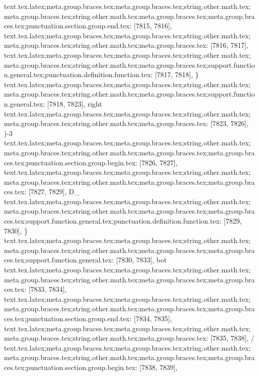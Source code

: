 {{{{{{{{{{{{{{{{{{{{{{{{{{{{{{{{{{{{{{{{{{{{{{{{{{{{{{{{{{{{{{{{{{{{{{{{{{{{{{{{{{{{{{{{{{{{{{{{{{{{{{{{{{{{{{{{{{{{{{{{{{{{{{{{{{{{{{{{{{{{{{{{{{{{{{{{{{{{{{{{{{{{{{{{{{{{{{{{{{{{{{{{{{{{{{{{{{{{{{{{{{{{{{{{{{{{{{{{{{{{{{{{{{{{{text.tex.latex;meta.group.braces.tex;meta.group.braces.tex;string.other.math.tex;meta.group.braces.tex;string.other.math.tex;meta.group.braces.tex;meta.group.braces.tex;punctuation.section.group.end.tex: [7815, 7816], {}}
text.tex.latex;meta.group.braces.tex;meta.group.braces.tex;string.other.math.tex;meta.group.braces.tex;string.other.math.tex;meta.group.braces.tex: [7816, 7817], { }
text.tex.latex;meta.group.braces.tex;meta.group.braces.tex;string.other.math.tex;meta.group.braces.tex;string.other.math.tex;meta.group.braces.tex;support.function.general.tex;punctuation.definition.function.tex: [7817, 7818], {\}
text.tex.latex;meta.group.braces.tex;meta.group.braces.tex;string.other.math.tex;meta.group.braces.tex;string.other.math.tex;meta.group.braces.tex;support.function.general.tex: [7818, 7823], {right}
text.tex.latex;meta.group.braces.tex;meta.group.braces.tex;string.other.math.tex;meta.group.braces.tex;string.other.math.tex;meta.group.braces.tex: [7823, 7826], {)-3}
text.tex.latex;meta.group.braces.tex;meta.group.braces.tex;string.other.math.tex;meta.group.braces.tex;string.other.math.tex;meta.group.braces.tex;meta.group.braces.tex;punctuation.section.group.begin.tex: [7826, 7827], {{}
text.tex.latex;meta.group.braces.tex;meta.group.braces.tex;string.other.math.tex;meta.group.braces.tex;string.other.math.tex;meta.group.braces.tex;meta.group.braces.tex: [7827, 7829], {D_}
text.tex.latex;meta.group.braces.tex;meta.group.braces.tex;string.other.math.tex;meta.group.braces.tex;string.other.math.tex;meta.group.braces.tex;meta.group.braces.tex;support.function.general.tex;punctuation.definition.function.tex: [7829, 7830], {\}
text.tex.latex;meta.group.braces.tex;meta.group.braces.tex;string.other.math.tex;meta.group.braces.tex;string.other.math.tex;meta.group.braces.tex;meta.group.braces.tex;support.function.general.tex: [7830, 7833], {bot}
text.tex.latex;meta.group.braces.tex;meta.group.braces.tex;string.other.math.tex;meta.group.braces.tex;string.other.math.tex;meta.group.braces.tex;meta.group.braces.tex: [7833, 7834], { }
text.tex.latex;meta.group.braces.tex;meta.group.braces.tex;string.other.math.tex;meta.group.braces.tex;string.other.math.tex;meta.group.braces.tex;meta.group.braces.tex;punctuation.section.group.end.tex: [7834, 7835], {}}
text.tex.latex;meta.group.braces.tex;meta.group.braces.tex;string.other.math.tex;meta.group.braces.tex;string.other.math.tex;meta.group.braces.tex: [7835, 7838], { / }
text.tex.latex;meta.group.braces.tex;meta.group.braces.tex;string.other.math.tex;meta.group.braces.tex;string.other.math.tex;meta.group.braces.tex;meta.group.braces.tex;punctuation.section.group.begin.tex: [7838, 7839], {{}
}}}}}}}}}}}}}}}}}}}}}}}}}}}}}}}}}}}}}}}}}}}}}}}}}}}}}}}}}}}}}}}}}}}}}}}}}}}}}}}}}}}}}}}}}}}}}}}}}}}}}}}}}}}}}}}}}}}}}}}}}}}}}}}}}}}}}}}}}}}}}}}}}}}}}}}}}}}}}}}}}}}}}}}}}}}}}}}}}}}}}}}}}}}}}}}}}}}}}}}}}}}}}}}}}}}}}}}}}}}}}}}}}}}}}}}
